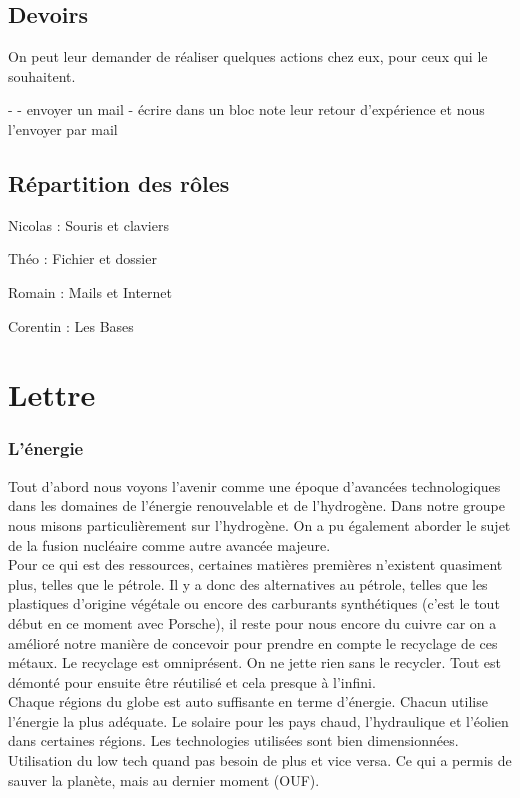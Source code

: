 {\section{Devoirs}

On peut leur demander de réaliser quelques actions chez eux, pour ceux qui le souhaitent.

- 
- envoyer un mail
- écrire dans un bloc note leur retour d'expérience et nous l'envoyer par mail



\section{Répartition des rôles}

Nicolas : Souris et claviers

Théo : Fichier et dossier

Romain : Mails et Internet

Corentin : Les Bases


\chapter{Lettre}

\subsection{L'énergie}

Tout d'abord nous voyons l'avenir comme une époque d'avancées technologiques dans les domaines de l'énergie renouvelable et de l'hydrogène. Dans notre groupe nous misons particulièrement sur l'hydrogène. On a pu également aborder le sujet de la fusion nucléaire comme autre avancée majeure.\\

Pour ce qui est des ressources,  certaines matières premières n’existent quasiment plus, telles que le pétrole. Il y a donc des alternatives au pétrole, telles que les plastiques d’origine végétale ou encore des carburants synthétiques (c'est le tout début en ce moment avec Porsche), il reste pour nous encore du cuivre car on a amélioré notre manière de concevoir pour prendre en compte le recyclage de ces métaux.
Le recyclage est omniprésent. On ne jette rien sans le recycler. Tout est démonté pour ensuite être réutilisé et cela presque à l’infini.\\



Chaque régions du globe est auto suffisante en terme d’énergie. Chacun utilise l’énergie la plus adéquate. Le solaire pour les pays chaud, l’hydraulique et l’éolien dans certaines régions. Les technologies utilisées sont bien dimensionnées. Utilisation du low tech quand pas besoin de plus et vice versa. Ce qui a permis de sauver la planète, mais au dernier moment (OUF).


}
